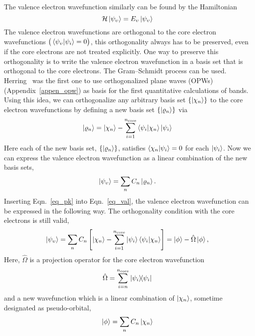 The valence electron wavefunction similarly can be found by the Hamiltonian
\begin{equation}
\label{eq_val_hamil}
\mathcal{H}\ket{\psi_{\upsilon}} = E_{\upsilon} \ket{\psi_{\upsilon}}
\end{equation}
The valence electron wavefunctions are orthogonal to the core electron wavefunctions $\big(\braket{\psi_{\upsilon}}{\psi_i}=0\big)$, this orthogonality always has to be preserved, even if the core electrons are not treated explicitly. One way to preserve this orthogonality is to write the valence electron wavefunction in a basis set that is orthogonal to the core electrons. The Gram--Schmidt process can be used. Herring~\cite{herring1940new} was the first one to use orthogonalized plane waves (OPWs) (Appendix~\ref{appen_opw}) as basis for the first quantitative calculations of bands. Using this idea, we can orthogonalize any arbitrary basis set $\{\ket{\chi_n}\}$ to the core electron wavefunctions by defining a new basis set $\{\ket{\varrho_n}\}$ via
\begin{equation}
\label{eq_pk}
\ket{\varrho_n} = \ket{\chi_n} - \sum^{n_{\text{core}}}_{i=1} \braket{\psi_i}{\chi_n}\ket{\psi_i}
\end{equation}
Here each of the new basis set, $\{\ket{\varrho_n}\}$, satisfies $\braket{\chi_n}{\psi_i} = 0$ for each $\ket{\psi_i}$. Now we can express the valence electron wavefunction as a linear combination of the new basis sets,
\begin{equation}
\label{eq_val}
\ket{\psi_{\upsilon}} = \sum_n C_n \ket{\varrho_n}. 
\end{equation}
Inserting Eqn.~\eqref{eq_pk} into Eqn.~\eqref{eq_val}, the valence electron wavefunction can be expressed in the following way. The orthogonality condition with the core electrons is still valid,
\begin{equation}
\ket{\psi_{\upsilon}} = \sum_n C_n \left [ \ket{\chi_n} - \sum_{i=1}^{n_{\text{core}}} \ket{\psi_i}\braket{\psi_i}{\chi_n} \right ] = \ket{\phi} - \hat{\Omega}\ket{\phi},
\end{equation}
Here, $\hat{\Omega}$ is a projection operator for the core electron wavefunction
\begin{equation}
\label{eq_projection}
\hat{\Omega} = \sum_{i=n}^{n_{\text{core}}} \dyad{\psi_i}{\psi_i}
\end{equation}
and a new wavefunction which is a linear combination of $\ket{\chi_n}$, sometime designated as pseudo-orbital,
\begin{equation}
\label{eq_pseudoorbital}
\ket{\phi} = \sum_n C_n \ket{\chi_n}
\end{equation}
